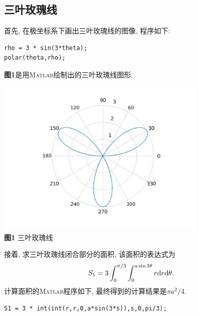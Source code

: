 \documentclass[a4paper,12pt]{article}
\begin{document}
\begin{CJK*}{UTF8}{gbsn}
\section{三叶玫瑰线}
首先, 在极坐标系下画出三叶玫瑰线的图像, 程序如下:\vspace{-15pt}
\begin{lstlisting}
rho = 3 * sin(3*theta);
polar(theta,rho);
\end{lstlisting}\par\vspace{10pt}
\textbf{图1}是用\textsc{Matlab}绘制出的三叶玫瑰线图形.\vspace{-5pt}
\begin{center}
\includegraphics[width = 10cm]{three_leaf_rose_curve.jpg}\\
\vspace{-15pt}\textbf{图1} 三叶玫瑰线\\
\end{center}\vspace{5pt}
接着, 求三叶玫瑰线闭合部分的面积, 该面积的表达式为
\begin{equation*}
S_1=3\int_{0}^{\pi/3}\int_{0}^{a\sin{3\theta}}r{\rm d}r{\rm d}\theta.
\end{equation*}
计算面积的\textsc{Matlab}程序如下, 最终得到的计算结果是$\pi a^2/4$.\vspace{-15pt}
\begin{lstlisting}
S1 = 3 * int(int(r,r,0,a*sin(3*s)),s,0,pi/3);
\end{lstlisting}\par




\end{CJK*}
\end{document}
